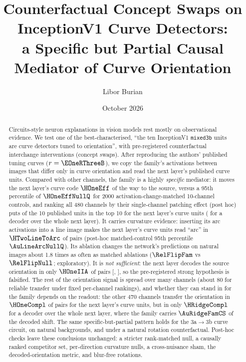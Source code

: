 \documentclass[11pt]{article}
\title{Counterfactual Concept Swaps on InceptionV1 Curve Detectors:\\ a Specific but Partial Causal Mediator of Curve Orientation}
\author{Libor Burian}
\date{October 2026}
\begin{document}
\maketitle

\begin{abstract}
Circuits-style neuron explanations in vision models rest mostly on observational evidence. We test one of the best-characterised, ``the ten InceptionV1 \texttt{mixed3b} units are curve detectors tuned to orientation'', with pre-registered counterfactual interchange interventions (concept swaps). After reproducing the authors' published tuning curves ($r=\EOneRThreeB$), we copy the family's activations between images that differ only in curve orientation and read the next layer's published curve units. Compared with other channels, the family is a highly \emph{specific} mediator: it moves the next layer's curve code $\HOneEff$ of the way to the source, versus a 95th percentile of $\HOneEffNullQ$ for 2000 activation-change-matched 10-channel controls, and ranking all 480 channels by their single-channel patching effect (post hoc) puts \AuTopOverlap{} of the 10 published units in the top 10 for the next layer's curve units (\TrRidgeOverlap{} for a decoder over the whole next layer). It carries curvature evidence: inserting its arc activations into a line image makes the next layer's curve units read ``arc'' in $\HTwoLineToArc$ of pairs (post-hoc matched-control 95th percentile $\AuLineArcNullQ$). Its ablation changes the network's predictions on natural images about 1.8 times as often as matched ablations ($\RelFlipFam$ vs $\RelFlipNull$; exploratory). It is \emph{not sufficient}: the next layer decodes the source orientation in only $\HOneIIA$ of pairs [\HOneIIALo, \HOneIIAHi], so the pre-registered strong hypothesis is falsified. The rest of the orientation signal is spread over many channels (about 80 for reliable transfer under fixed per-channel rankings), and whether they can stand in for the family depends on the readout: the other 470 channels transfer the orientation in $\HOneCompl$ of pairs for the next layer's curve units, but in only $\HRidgeCompl$ for a decoder over the whole next layer, where the family carries $\AuRidgeFamCS$ of the decoded shift. The same specific-but-partial pattern holds for the 3a$\to$3b curve circuit, on natural backgrounds, and under a natural rotation counterfactual. Post-hoc checks leave these conclusions unchanged: a stricter rank-matched null, a causally ranked competitor set, per-direction curvature nulls, a cross-nuisance sham, the decoded-orientation metric, and blur-free rotations.
\end{abstract}
\end{document}
